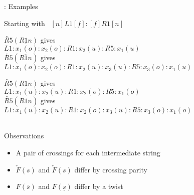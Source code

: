 \begin{frame}{\subsecname: Examples}
\begin{adjustwidth}{-2em}{-2em}
Starting with $\enspace [n]L1[f]:[f]R1[n]$\\
\begin{minipage}{0.55\columnwidth}
 $\underleftarrow{R5}(\underline{R1n})$ gives \\
$L1:x_1(o):x_2(o):R1:x_2(u):R5:x_1(u)$\\
\vfill
 $\underleftarrow{R5}(\overline{R1n})$ gives \\
$L1:x_1(o):x_2(o):R1:x_2(u):x_3(u):R5:x_3(o):x_1(u)$\\
\end{minipage}
\hfill
\begin{minipage}{0.55\columnwidth}
 $\overleftarrow{R5}(\underline{R1n})$ gives \\
$L1:x_1(u):x_2(u):R1:x_2(o):R5:x_1(o)$\\
\vfill
 $\overleftarrow{R5}(\overline{R1n})$ gives \\
$L1:x_1(u):x_2(u):R1:x_2(o):x_3(u):R5:x_3(o):x_1(o)$\\
\end{minipage}\\
 Observations
\begin{itemize}
    \item A pair of crossings for each intermediate string
    \item $\overleftarrow F(s)$ and $\underleftarrow F(s)$ differ by crossing parity
    \item $F(\overline s)$ and $F(\underline s)$ differ by a twist
\end{itemize}
\end{adjustwidth}
\end{frame}



